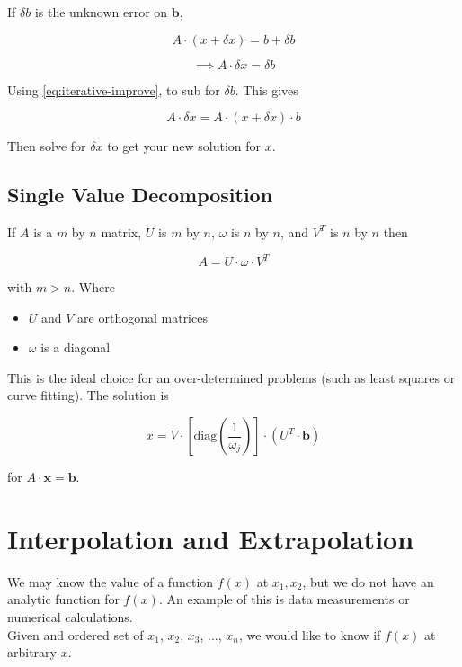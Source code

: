 \documentclass[]{article}
\begin{document}
If $\delta b$ is the unknown error on $\bm{b}$,

\begin{equation}\label{eq:iterative-improve}
	A \cdot (x+ \delta x) = b + \delta b
\end{equation}

\[\implies A \cdot\delta x = \delta b\]

Using \ref{eq:iterative-improve}, to sub for $\delta b$. This gives 

\[A \cdot \delta x = A \cdot (x + \delta x) \cdot b\]

Then solve for $\delta x$ to get your new solution for $x$.\\

\subsection{Single Value Decomposition}\bigbreak

If $A$ is a $m$ by $n$ matrix, $U$ is $m$ by $n$, $\omega$ is $n$ by $n$, and $V^T$ is $n$ by $n$ then

\[A = U \cdot \omega \cdot V^T\]

with $m>n$. Where

\begin{itemize}
	\item $U$ and $V$ are orthogonal matrices
	\item $\omega$ is a diagonal
\end{itemize}

This is the ideal choice for an over-determined problems (such as least squares or curve fitting). The solution is

\[x = V \cdot \left[\text{diag}\left(\frac{1}{\omega_j}\right)\right]\cdot \left(U^T \cdot \bm{b}\right)\]

for $A\cdot \bm{x}=\bm{b}$.\\

\section{Interpolation and Extrapolation}\bigbreak\bigbreak

We may know the value of a function $f(x)$ at $x_1, x_2$, but we do not have an analytic function for $f(x)$. An example of this is data measurements or numerical calculations.\\

Given and ordered set of {$x_1$, $x_2$, $x_3$, ..., $x_n$}, we would like to know if $f(x)$ at arbitrary $x$.\\
\end{document}
